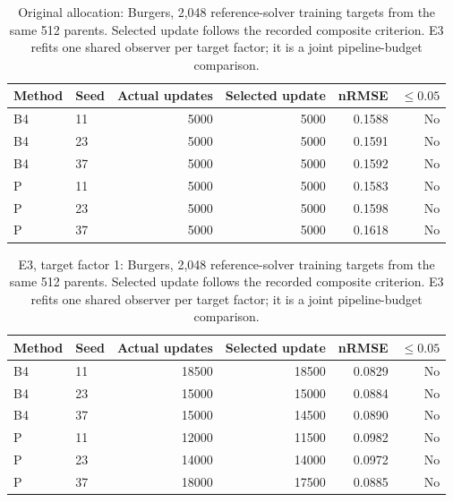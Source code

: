 \begin{table}[!ht]
\centering\small
\caption{Original allocation: Burgers, 2,048 reference-solver training targets from the same 512 parents. Selected update follows the recorded composite criterion. E3 refits one shared observer per target factor; it is a joint pipeline-budget comparison.}\label{tab:scaling_original_1}
\begin{tabular}{@{}llrrrr@{}}\toprule
Method & Seed & Actual updates & Selected update & nRMSE & $\leq0.05$\\\midrule
B4 & 11 & 5000 & 5000 & 0.1588 & No\\
B4 & 23 & 5000 & 5000 & 0.1591 & No\\
B4 & 37 & 5000 & 5000 & 0.1592 & No\\
P & 11 & 5000 & 5000 & 0.1583 & No\\
P & 23 & 5000 & 5000 & 0.1598 & No\\
P & 37 & 5000 & 5000 & 0.1618 & No\\
\bottomrule\end{tabular}
\end{table}

\begin{table}[!ht]
\centering\small
\caption{E3, target factor 1: Burgers, 2,048 reference-solver training targets from the same 512 parents. Selected update follows the recorded composite criterion. E3 refits one shared observer per target factor; it is a joint pipeline-budget comparison.}\label{tab:scaling_E3_1}
\begin{tabular}{@{}llrrrr@{}}\toprule
Method & Seed & Actual updates & Selected update & nRMSE & $\leq0.05$\\\midrule
B4 & 11 & 18500 & 18500 & 0.0829 & No\\
B4 & 23 & 15000 & 15000 & 0.0884 & No\\
B4 & 37 & 15000 & 14500 & 0.0890 & No\\
P & 11 & 12000 & 11500 & 0.0982 & No\\
P & 23 & 14000 & 14000 & 0.0972 & No\\
P & 37 & 18000 & 17500 & 0.0885 & No\\
\bottomrule\end{tabular}
\end{table}


